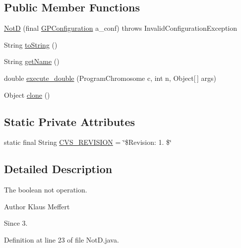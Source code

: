 \subsection*{Public Member Functions}
\begin{DoxyCompactItemize}
\item 
\hyperlink{classexamples_1_1gp_1_1symbolic_regression_1_1_not_d_aee2d825cd4405762b927974374c4d892}{Not\-D} (final \hyperlink{classorg_1_1jgap_1_1gp_1_1impl_1_1_g_p_configuration}{G\-P\-Configuration} a\-\_\-conf)  throws Invalid\-Configuration\-Exception 
\item 
String \hyperlink{classexamples_1_1gp_1_1symbolic_regression_1_1_not_d_a952456690912fd0484f47f9b0deed39d}{to\-String} ()
\item 
String \hyperlink{classexamples_1_1gp_1_1symbolic_regression_1_1_not_d_a2f65463461a1bce3a9dd71865c85653a}{get\-Name} ()
\item 
double \hyperlink{classexamples_1_1gp_1_1symbolic_regression_1_1_not_d_a9ac9e302bd7fab74904aa22eb453dc61}{execute\-\_\-double} (Program\-Chromosome c, int n, Object\mbox{[}$\,$\mbox{]} args)
\item 
Object \hyperlink{classexamples_1_1gp_1_1symbolic_regression_1_1_not_d_a341de4d554ffac8ce3288c71c59c041a}{clone} ()
\end{DoxyCompactItemize}
\subsection*{Static Private Attributes}
\begin{DoxyCompactItemize}
\item 
static final String \hyperlink{classexamples_1_1gp_1_1symbolic_regression_1_1_not_d_a0d36e8cc7b21c513a99a80f6d39e7a90}{C\-V\-S\-\_\-\-R\-E\-V\-I\-S\-I\-O\-N} = \char`\"{}\$Revision\-: 1. \$\char`\"{}
\end{DoxyCompactItemize}


\subsection{Detailed Description}
The boolean not operation.

\begin{DoxyAuthor}{Author}
Klaus Meffert 
\end{DoxyAuthor}
\begin{DoxySince}{Since}
3. 
\end{DoxySince}


Definition at line 23 of file Not\-D.\-java.



